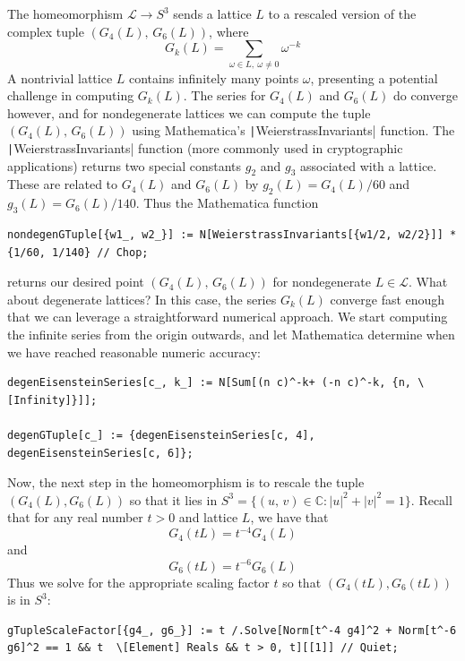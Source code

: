 \documentclass[12pt,twoside]{reedthesis}
\theoremstyle{definition}
\newcommand{\C}{\mathbb{C}}
\newcommand{\LS}{\mathcal{L}}
\begin{document}
The homeomorphism $\LS \to S^3$ sends a lattice $L$ to a rescaled version of the complex tuple $(G_4(L),\, G_6(L))$, where
\begin{equation*}
  G_k(L) = \sum_{\omega \in L,\ \omega \neq 0} \omega^{-k}
\end{equation*}
A nontrivial lattice $L$ contains infinitely many points $\omega$, presenting a potential challenge in computing $G_k(L)$.
The series for $G_4(L)$ and $G_6(L)$ do converge however, and for nondegenerate lattices we can compute the tuple $(G_4(L),\, G_6(L))$ using Mathematica's \texttt|WeierstrassInvariants| function.
The \texttt|WeierstrassInvariants| function (more commonly used in cryptographic applications) returns two special constants $g_2$ and $g_3$ associated with a lattice.
These are related to $G_4(L)$ and $G_6(L)$ by $g_2(L) = G_4(L) / 60$ and $g_3(L) = G_6(L) / 140$.
Thus the Mathematica function
\begin{verbatim}
nondegenGTuple[{w1_, w2_}] := N[WeierstrassInvariants[{w1/2, w2/2}]] * {1/60, 1/140} // Chop;
\end{verbatim}
returns our desired point $(G_4(L),\, G_6(L))$ for nondegenerate $L \in \LS$.
What about degenerate lattices?
In this case, the series $G_k(L)$ converge fast enough that we can leverage a straightforward numerical approach.
We start computing the infinite series from the origin outwards, and let Mathematica determine when we have reached reasonable numeric accuracy:
\begin{verbatim}
degenEisensteinSeries[c_, k_] := N[Sum[(n c)^-k+ (-n c)^-k, {n, \[Infinity]}]];

degenGTuple[c_] := {degenEisensteinSeries[c, 4], degenEisensteinSeries[c, 6]};
\end{verbatim}
Now, the next step in the homeomorphism is to rescale the tuple $(G_4(L), G_6(L))$ so that it lies in $S^3 = \{(u,\, v) \in \C : |u|^2 + |v|^2 = 1\}$.
Recall that for any real number $t > 0$ and lattice $L$, we have that
\begin{equation*}
  G_4(tL) = t^{-4}G_4(L)
\end{equation*}
and
\begin{equation*}
  G_6(tL) = t^{-6} G_6(L)
\end{equation*}
Thus we solve for the appropriate scaling factor $t$ so that $(G_4(tL), G_6(tL))$ is in $S^3$:
\begin{verbatim}
gTupleScaleFactor[{g4_, g6_}] := t /.Solve[Norm[t^-4 g4]^2 + Norm[t^-6 g6]^2 == 1 && t  \[Element] Reals && t > 0, t][[1]] // Quiet;
\end{verbatim}
\end{document}
